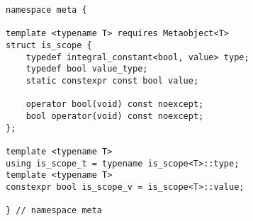 
\begin{verbatim}
namespace meta {

template <typename T> requires Metaobject<T>
struct is_scope {
	typedef integral_constant<bool, value> type;
	typedef bool value_type;
	static constexpr const bool value;

	operator bool(void) const noexcept;
	bool operator(void) const noexcept;
};

template <typename T>
using is_scope_t = typename is_scope<T>::type;
template <typename T>
constexpr bool is_scope_v = is_scope<T>::value;

} // namespace meta
\end{verbatim}
